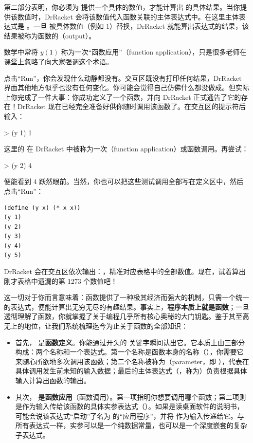 第二部分表明，你必须为  提供一个具体的数值，才能计算出  的具体结果。当你提供该数值时，DrRacket 会将该数值代入函数关联的主体表达式中。在这里主体表达式是 。一旦  被具体数值（例如 1）替换，DrRacket 就能算出表达式的结果，该结果被称为函数的（output）。

\begin{notebox}[数学记法对比]
数学中常将 $y(1)$ 称为一次“函数应用”（function application），只是很多老师在课堂上忽略了向大家强调这个术语。
\end{notebox}

点击“Run”，你会发现什么动静都没有。交互区既没有打印任何结果，DrRacket 界面其他地方似乎也没有任何变化。你可能会觉得自己仿佛什么都没做成。但实际上你完成了一件大事：你成功定义了一个函数，并向 DrRacket 正式通告了它的存在！DrRacket 现在已经完全准备好供你随时调用该函数了。在交互区的提示符后输入：
\begin{replbox}
> (y 1)
1
\end{replbox}
这里的  在 DrRacket 中被称为一次（function application）或函数调用。再尝试：
\begin{replbox}
> (y 2)
4
\end{replbox}
便能看到 4 跃然眼前。当然，你也可以把这些测试调用全部写在定义区中，然后点击“Run”：
\begin{lstlisting}[language=BSL]
(define (y x) (* x x))
(y 1)
(y 2)
(y 3)
(y 4)
(y 5)
\end{lstlisting}
DrRacket 会在交互区依次输出：，精准对应表格中的全部数值。现在，试着算出刚才表格中遗漏的第 1273 个数值吧！

这一切对于你而言意味着：函数提供了一种极其经济而强大的机制，只需一个统一的表达式，便能计算出无穷无尽的有趣结果。事实上，\textbf{程序本质上就是函数}；一旦透彻理解了函数，你就掌握了关于编程几乎所有核心奥秘的大门钥匙。鉴于其至高无上的地位，让我们系统梳理迄今为止关于函数的全部知识：
\begin{itemize}
  \item 首先， 是\textbf{函数定义}。你能通过开头的  关键字瞬间认出它。它本质上由三部分构成：两个名称和一个表达式。第一个名称是函数本身的名称（），你需要它来随心所欲地多次调用该函数；第二个名称被称为（parameter，即 ），代表在具体调用发生前未知的输入数据；最后的主体表达式（，称为）负责根据具体输入计算出函数的输出。
  
  \item 其次， 是\textbf{函数应用}（函数调用）。第一项指明你想要调用哪个函数；第二项则是作为输入传给该函数的具体实参表达式（）。如果是读桌面软件的说明书，可能会说该表达式“启动”了名为  的“应用程序”，并将  作为输入传递给它。与所有表达式一样，实参可以是一个纯数据常量，也可以是一个深度嵌套的复杂子表达式。
\end{itemize}

